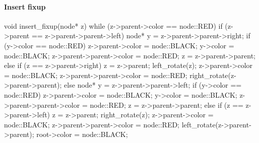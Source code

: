 \documentclass{report}
\begin{document}
\paragraph{Insert fixup}
\bigbreak \noindent 
\begin{cppcode}
    void insert_fixup(node* z) {
        while (z->parent->color == node::RED) {
            if (z->parent == z->parent->parent->left) {
                node* y = z->parent->parent->right;
                if (y->color == node::RED) {
                    z->parent->color = node::BLACK;
                    y->color = node::BLACK;
                    z->parent->parent->color = node::RED;
                    z = z->parent->parent;
                } else {
                    if (z == z->parent->right) {
                        z = z->parent;
                        left_rotate(z);
                    }
                    z->parent->color = node::BLACK;
                    z->parent->parent->color = node::RED;
                    right_rotate(z->parent->parent);
                }
            } else {
                node* y = z->parent->parent->left;
                if (y->color == node::RED) {
                    z->parent->color = node::BLACK;
                    y->color = node::BLACK;
                    z->parent->parent->color = node::RED;
                    z = z->parent->parent;
                } else {
                    if (z == z->parent->left) {
                        z = z->parent;
                        right_rotate(z);
                    }
                    z->parent->color = node::BLACK;
                    z->parent->parent->color = node::RED;
                    left_rotate(z->parent->parent);
                }
            }
        }
        root->color = node::BLACK;
    }
\end{cppcode}

\pagebreak \bigbreak \noindent 
\end{document}
